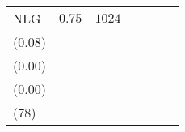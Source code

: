 \begin{table*}[t]
\begin{tabular}{lrrrrrr}
NLG & \(0.75\) & \(1024\) & \longcell{\(0.59\)\\{\tiny(\(0.08\))}} & \longcell{\(0.00\)\\{\tiny(\(0.00\))}} & \longcell{\(0.85\)\\{\tiny(\(0.00\))}} & \longcell{\(5679\)\\{\tiny(\(78\))}} \\[2.2ex]

\end{tabular}
\end{table*}

